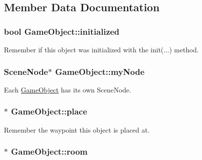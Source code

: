 \subsection{\-Member \-Data \-Documentation}
\hypertarget{classGameObject_af98cecb661e1ffaa19d0d92041020319}{
\subsubsection[{initialized}]{\setlength{\rightskip}{0pt plus 5cm}bool {\bf \-Game\-Object\-::initialized}}}\label{classGameObject_af98cecb661e1ffaa19d0d92041020319}
\-Remember if this object was initialized with the init(...) method. \hypertarget{classGameObject_a44fbbf424125cebcb1e9a071946b6567}{
\subsubsection[{my\-Node}]{\setlength{\rightskip}{0pt plus 5cm}\-Scene\-Node$\ast$ {\bf \-Game\-Object\-::my\-Node}}}\label{classGameObject_a44fbbf424125cebcb1e9a071946b6567}
\-Each \hyperlink{classGameObject}{\-Game\-Object} has its own \-Scene\-Node. \hypertarget{classGameObject_ae8983dfdcfe7bcd2e81fe20a674bb3e6}{
\subsubsection[{place}]{$\ast$ {\bf \-Game\-Object\-::place}}}\label{classGameObject_ae8983dfdcfe7bcd2e81fe20a674bb3e6}
\-Remember the waypoint this object is placed at. \hypertarget{classGameObject_a9f63419cc03f2513f757a317a2e37557}{
\subsubsection[{room}]{$\ast$ {\bf \-Game\-Object\-::room}}}\label{classGameObject_a9f63419cc03f2513f757a317a2e37557}
